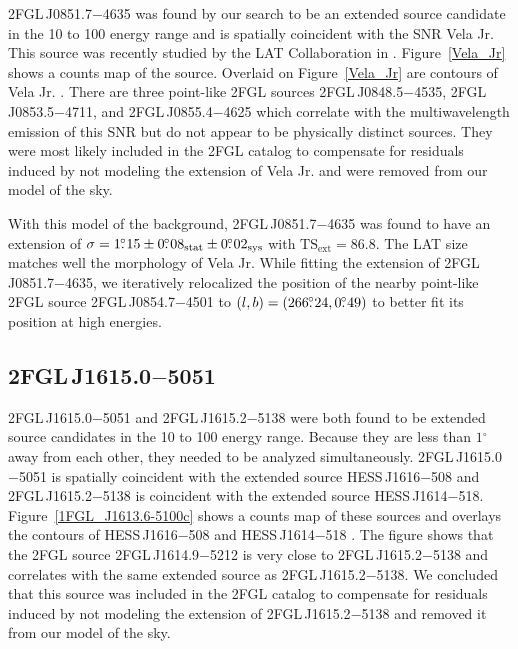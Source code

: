 \documentclass[12pt,preprint]{aastex}
\newcommand{\gev}{\text{GeV}\xspace}
\newcommand{\tev}{\text{TeV}\xspace}
\newcommand{\tsext}{{\ensuremath{\text{TS}_{\text{ext}}}}\xspace}
\newcommand{\sys}{\text{sys}\xspace}
\newcommand{\stat}{\text{stat}\xspace}
\newcommand{\degree}{\ensuremath{^\circ}\xspace}
\begin{document}

2FGL\,J0851.7$-$4635 was found by our search to be an extended source
candidate in the 10 \gev to 100 \gev energy range and is spatially
coincident with the SNR Vela Jr. This source was recently studied by the LAT
Collaboration in \cite{vela_jr_lat}.  Figure~\ref{Vela_Jr} shows a counts
map of the source.  Overlaid on Figure~\ref{Vela_Jr} are \tev
contours of Vela Jr. \citep{vela_jr_hess}.
There are three
point-like 2FGL sources 2FGL\,J0848.5$-$4535,
2FGL\,J0853.5$-$4711, and
2FGL\,J0855.4$-$4625
which correlate with the 
multiwavelength
emission of
this SNR but do not appear to be physically distinct sources.
They were most likely included in the 2FGL catalog to compensate for residuals
induced by not modeling the extension of Vela Jr. and were removed
from our model of the sky.  

With this model of the background, 2FGL\,J0851.7$-$4635 was found to
have an extension of $\sigma=1\fdg15\pm0\fdg08_\stat\pm0\fdg02_\sys$ with
$\tsext=86.8$.  The LAT size matches
well the \tev morphology of Vela Jr.  While fitting the extension
of 2FGL\,J0851.7$-$4635, we iteratively relocalized the position
of the nearby point-like 2FGL source 2FGL\,J0854.7$-$4501 to
$(l,b)=(266\mbox{$.\!\!^\circ$}24,0\mbox{$.\!\!^\circ$}49)$ to better fit its position at high energies.
    



\subsection{2FGL\,J1615.0$-$5051}
\label{section_2FGL_J1615.0-5051}


2FGL\,J1615.0$-$5051 and 2FGL\,J1615.2$-$5138 were both found to be
extended source candidates in the 10 \gev to 100 \gev energy range. Because
they are less than $1\degree$ away from each other, they needed to be analyzed
simultaneously.  2FGL\,J1615.0$-$5051 is spatially coincident with
the extended \tev source HESS\,J1616$-$508 and 2FGL\,J1615.2$-$5138
is coincident with the extended \tev source HESS\,J1614$-$518.
Figure~\ref{1FGL_J1613.6-5100c} shows a counts map of these sources and
overlays the \tev contours of HESS\,J1616$-$508 and HESS\,J1614$-$518
\citep{hess_plane_survey}.  The figure shows that the 2FGL source
2FGL\,J1614.9$-$5212 is very close to 2FGL\,J1615.2$-$5138 and correlates
with the same extended \tev source as 2FGL\,J1615.2$-$5138.  We concluded
that this source was included in the 2FGL catalog to compensate for residuals induced
by not modeling the extension of 2FGL\,J1615.2$-$5138 and removed
it from our model of the sky.  
\end{document}
